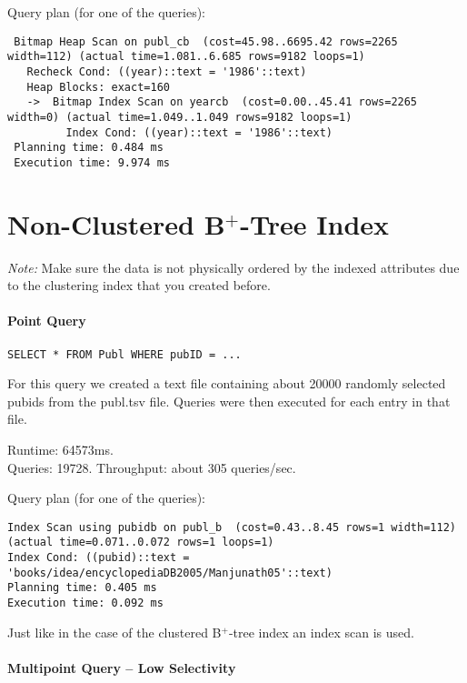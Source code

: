\documentclass[11pt]{scrartcl}
\begin{document}
\smallskip\noindent
Query plan (for one of the queries):
{\small
\begin{verbatim}
 Bitmap Heap Scan on publ_cb  (cost=45.98..6695.42 rows=2265 width=112) (actual time=1.081..6.685 rows=9182 loops=1)
   Recheck Cond: ((year)::text = '1986'::text)
   Heap Blocks: exact=160
   ->  Bitmap Index Scan on yearcb  (cost=0.00..45.41 rows=2265 width=0) (actual time=1.049..1.049 rows=9182 loops=1)
         Index Cond: ((year)::text = '1986'::text)
 Planning time: 0.484 ms
 Execution time: 9.974 ms
\end{verbatim}
}

\section{Non-Clustered B$^+$-Tree Index}

\noindent \emph{Note:} Make sure the data is not physically ordered by
the indexed attributes due to the clustering index that you created
before.

\paragraph{Point Query}

{\small
\begin{verbatim}
SELECT * FROM Publ WHERE pubID = ...
\end{verbatim}
}

\noindent
For this query we created a text file containing about 20000 randomly selected pubids from the publ.tsv file. Queries were then executed for each entry in that file.

\smallskip\noindent
Runtime: 64573ms. \\
Queries: 19728.
Throughput: about 305 queries/sec.

\smallskip\noindent
Query plan (for one of the queries):
{\small
\begin{verbatim}
Index Scan using pubidb on publ_b  (cost=0.43..8.45 rows=1 width=112) (actual time=0.071..0.072 rows=1 loops=1)
Index Cond: ((pubid)::text = 'books/idea/encyclopediaDB2005/Manjunath05'::text)
Planning time: 0.405 ms
Execution time: 0.092 ms
\end{verbatim}
Just like in the case of the clustered B$^+$-tree index an index scan is used.
}


\paragraph{Multipoint Query -- Low Selectivity}
\end{document}
